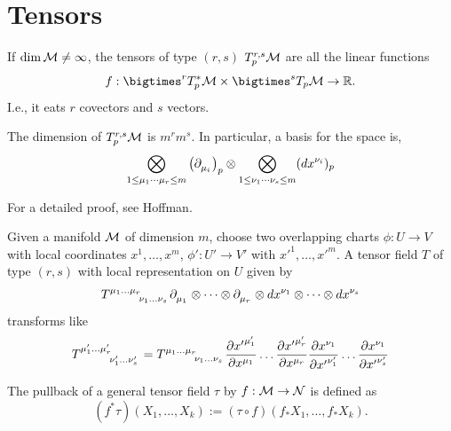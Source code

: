 \documentclass[../main.tex]{subfiles}
\begin{document}
    \section{Tensors}
    \begin{definition}[Tensors]\label{def:tensor-finite}
        If \(\dim \manifold[M] \neq \infty\), the tensors of type \((r, s)\) 
        \(T_p^{r, s}\manifold[M]\) are all the linear functions 
        \[
        f : \bigtimes^r T_p^*\manifold[M] \times \bigtimes^s T_p\manifold[M] 
        \to \mathbb{R}.
        \]
        I.e., it eats \(r\) covectors and \(s\) vectors.
    \end{definition}
    \begin{theorem}\label{thm:dim-tensor}
        The dimension of \(T_p^{r, s}\manifold[M]\) is \(m^rm^s\). In particular, 
        a basis for the space is, 
        \[
        \bigotimes_{1 \leq \mu_1 \cdots \mu_r \leq m} \tvec{\mu_i}{p} 
        \otimes \bigotimes_{1 \leq \nu_1 \cdots \nu_s \leq m} (dx^{\nu_i})_{p} 
        \]
    \end{theorem}
    \begin{remark}
        For a detailed proof, see Hoffman.
    \end{remark}
    \begin{theorem}\label{thm:tensor-transformation}
        Given a manifold \(\manifold[M]\) of dimension \(m\), choose two overlapping 
        charts \(\phi : U \to V\) with local coordinates \(x^1, \dots, x^m\), 
        \(\phi' : U' \to V'\) with \({x'}^1, \dots, {x'}^m\).
        A tensor field \(T\) of type \((r, s)\) with local representation on \(U\) given by 
        \[
        T\indices{^{\mu_1}^{\dots}^{\mu_r}_{\nu_1}_{\dots}_{\nu_s}}
        \tfld{\mu_1}\otimes\dots\otimes\tfld{\mu_r}\otimes
        dx^{\nu_1}\otimes\dots\otimes dx^{\nu_s}
        \]
        transforms like 
        \[
        T\indices{^{\mu_1'}^{\dots}^{\mu_r'}_{\nu_1'}_{\dots}_{\nu_s'}}
        =T\indices{^{\mu_1}^{\dots}^{\mu_r}_{\nu_1}_{\dots}_{\nu_s}}
        \frac{\partial {x'}^{\mu_1'}}{\partial x^{\mu_1}}\dots
        \frac{\partial {x'}^{\mu_r'}}{\partial x^{\mu_r}}
        \frac{\partial x^{\nu_1}}{\partial {x'}^{\nu_1'}}\dots
        \frac{\partial x^{\nu_1}}{\partial {x'}^{\nu_s'}}
        \]
    \end{theorem}
    \begin{definition}\label{def:covariant-tensor-pullback}
        The pullback of a general tensor field \(\tau\) by \(f : \manifold[M] \to 
        \manifold[N]\) is defined as 
        \[
        (f^*\tau)(X_1, \dots, X_k) := (\tau \circ f)(f_*X_1, \dots, f_*X_k).
        \]
    \end{definition}
\end{document}
